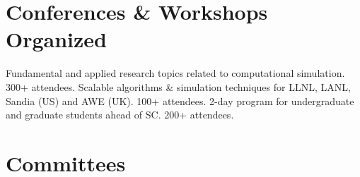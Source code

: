


\section{Conferences \& Workshops Organized}
		{%
		Fundamental and applied research topics related to %
		computational simulation. 300+ attendees.}
		{Scalable algorithms \& simulation techniques for LLNL, LANL, Sandia (US) and AWE (UK). 100+ attendees.}
		{2-day program for undergraduate and graduate students ahead of SC. 200+ attendees.}


\section{Committees}


